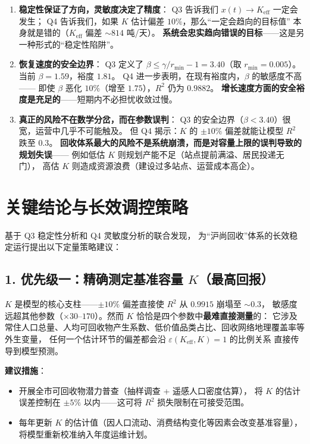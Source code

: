 \documentclass[12pt,a4paper]{article}
\begin{document}
\begin{enumerate}
  \item \textbf{稳定性保证了方向，灵敏度决定了精度}：
        Q3 告诉我们 $x(t) \to K_{\text{eff}}$ 一定会发生；
        Q4 告诉我们，如果 $K$ 估计偏差 $10\%$，那么``一定会趋向的目标值''
        本身就是错的（$K_{\text{eff}}$ 偏差 $\sim 814$ 吨/天）。
        \textbf{系统会忠实趋向错误的目标}——这是另一种形式的``稳定性陷阱''。

  \item \textbf{恢复速度的安全边界}：
        Q3 定义了 $\beta \leq \gamma/r_{\min} - 1 = 3.40$（取 $r_{\min} = 0.005$）。
        当前 $\beta = 1.59$，裕度 $1.81$。
        Q4 进一步表明，在现有裕度内，$\beta$ 的敏感度不高——
        即使 $\beta$ 恶化 $10\%$（增至 $1.75$），$R^2$ 仍为 $0.9882$。
        \textbf{增长速度方面的安全裕度是充足的}——短期内不必担忧收敛过慢。

  \item \textbf{真正的风险不在数学分岔，而在参数误判}：
        Q3 的安全边界（$\beta < 3.40$）很宽，运营中几乎不可能触及。
        但 Q4 揭示：$K$ 的 $\pm 10\%$ 偏差就能让模型 $R^2$ 跌至 $0.3$。
        \textbf{回收体系最大的风险不是系统崩溃，而是对容量上限的误判导致的规划失误}——
        例如低估 $K$ 则规划产能不足（站点提前满溢、居民投递无门），
        高估 $K$ 则造成资源浪费（建设过多站点、运营成本高企）。
\end{enumerate}

\section{关键结论与长效调控策略}

基于 Q3 稳定性分析和 Q4 灵敏度分析的联合发现，
为``沪尚回收''体系的长效稳定运行提出以下定量策略建议：

\subsection*{1. 优先级一：精确测定基准容量 $K$（最高回报）}

$K$ 是模型的核心支柱——$\pm 10\%$ 偏差直接使 $R^2$ 从 $0.9915$ 崩塌至 $\sim 0.3$，
敏感度远超其他参数（$\times 30$--$170$）。然而 $K$ 恰恰是四个参数中\textbf{最难直接测量}的：
它涉及常住人口总量、人均可回收物产生系数、低价值品类占比、回收网络地理覆盖率等外生变量，
任何一个估计环节的偏差都会沿 $\varepsilon(K_{\text{eff}}, K) = 1$ 的比例关系
直接传导到模型预测。

\textbf{建议措施}：
\begin{itemize}
  \item 开展全市可回收物潜力普查（抽样调查 + 遥感人口密度估算），
        将 $K$ 的估计误差控制在 $\pm 5\%$ 以内——这可将 $R^2$ 损失限制在可接受范围。
  \item 每年更新 $K$ 的估计值（因人口流动、消费结构变化等因素会改变基准容量），
        将模型重新校准纳入年度运维计划。
\end{itemize}
\end{document}
